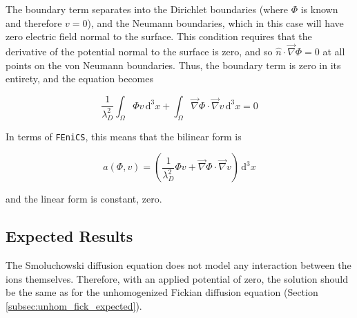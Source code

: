 The boundary term separates into the Dirichlet boundaries (where $\Phi$ is known and therefore $v=0$),
and the Neumann boundaries, which in this case will have zero electric field normal to the surface.
This condition requires that the derivative of the potential normal to the surface is zero,
and so $\hat{n} \cdot \vec{\nabla} \Phi = 0$ at all points on the von Neumann boundaries.
Thus, the boundary term is zero in its entirety, and the equation becomes

\begin{equation}
\frac{1}{\lambda_D^2} \int_{\Omega} \Phi v \,\mathrm{d}^3x
+ \int_{\Omega} \vec{\nabla}\Phi \cdot \vec{\nabla}v \,\mathrm{d}^3x
= 0
\end{equation}

In terms of \texttt{FEniCS}, this means that the bilinear form is

\begin{equation}
a(\Phi,v)=\left(\frac{1}{\lambda_D^2} \Phi v  + \vec{\nabla}\Phi \cdot \vec{\nabla}v \right) \,\mathrm{d}^3x
\end{equation}

and the linear form is constant, zero.

\subsection{Expected Results}\label{subsec:unhom_smol_expected}

The Smoluchowski diffusion equation does not model any interaction between the ions themselves.
Therefore, with an applied potential of zero,
the solution should be the same as for the
unhomogenized Fickian diffusion equation (Section \ref{subsec:unhom_fick_expected}).

